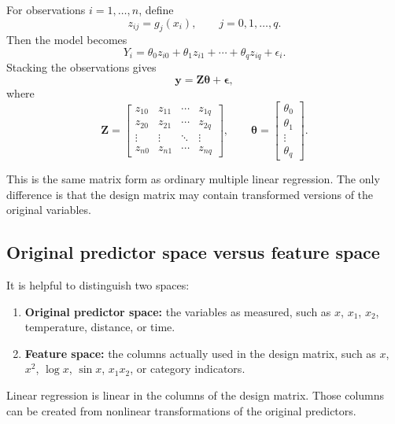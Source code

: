 For observations \(i=1,\ldots,n\), define
\begin{equation}
  z_{ij}=g_j(x_i),\qquad j=0,1,\ldots,q.
\end{equation}
Then the model becomes
\begin{equation}
  Y_i=\theta_0z_{i0}+\theta_1z_{i1}+\cdots+\theta_qz_{iq}+\epsilon_i.
\end{equation}
Stacking the observations gives
\begin{equation}
  \mathbf{y}=\mathbf{Z}\boldsymbol{\theta}+\boldsymbol{\epsilon},
  \label{eq:ch11-z-model}
\end{equation}
where
\begin{equation}
  \mathbf{Z}=\begin{bmatrix}
    z_{10} & z_{11} & \cdots & z_{1q} \\
    z_{20} & z_{21} & \cdots & z_{2q} \\
    \vdots & \vdots & \ddots & \vdots \\
    z_{n0} & z_{n1} & \cdots & z_{nq}
  \end{bmatrix},
  \qquad
  \boldsymbol{\theta}=\begin{bmatrix}
    \theta_0\\ \theta_1\\ \vdots\\ \theta_q
  \end{bmatrix}.
\end{equation}

This is the same matrix form as ordinary multiple linear regression.  The only difference is that the design matrix may contain transformed versions of the original variables.

\subsection*{Original predictor space versus feature space}

It is helpful to distinguish two spaces:
\begin{enumerate}
  \item \textbf{Original predictor space:} the variables as measured, such as \(x\), \(x_1\), \(x_2\), temperature, distance, or time.
  \item \textbf{Feature space:} the columns actually used in the design matrix, such as \(x\), \(x^2\), \(\log x\), \(\sin x\), \(x_1x_2\), or category indicators.
\end{enumerate}

Linear regression is linear in the columns of the design matrix.  Those columns can be created from nonlinear transformations of the original predictors.


